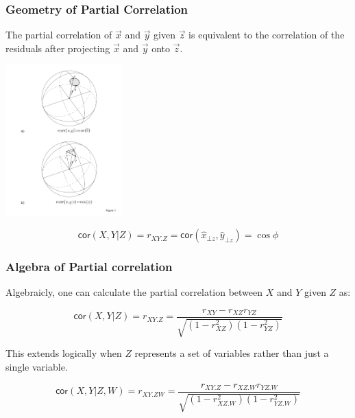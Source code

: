 \documentclass{beamer}
\begin{document}

\begin{frame}
  \frametitle{Geometry of Partial Correlation}

The partial correlation of $\vec{x}$ and $\vec{y}$ given $\vec{z}$ is equivalent to the correlation of the residuals after projecting $\vec{x}$ and $\vec{y}$ onto $\vec{z}$.

\begin{center}
\includegraphics[width=4.5cm]{partial-corr-sphere.pdf}
\end{center}
\[
\mathsf{cor}(X,Y|Z) = r_{XY.Z} = \mathsf{cor}(\widehat{x}_{\bot z},\widehat{y}_{\bot z}) = \cos \phi
\]


\end{frame}


\begin{frame}
  \frametitle{Algebra of Partial correlation}

Algebraicly, one can calculate the partial correlation between $X$ and $Y$ given $Z$ as:

\[
\mathsf{cor}(X,Y|Z) = r_{XY.Z} = \frac{r_{XY} - r_{XZ}r_{YZ}}{\sqrt{(1-r_{XZ}^2)(1-r_{YZ}^2)}}
\]

This extends logically when $Z$ represents a set of variables rather than just a single variable.

\[
\mathsf{cor}(X,Y|Z,W) = r_{XY.ZW} = \frac{r_{XY.Z} - r_{XZ.W}r_{YZ.W}}{\sqrt{(1-r_{XZ.W}^2)(1-r_{YZ.W}^2)}}
\]

\end{frame}
\end{document}
